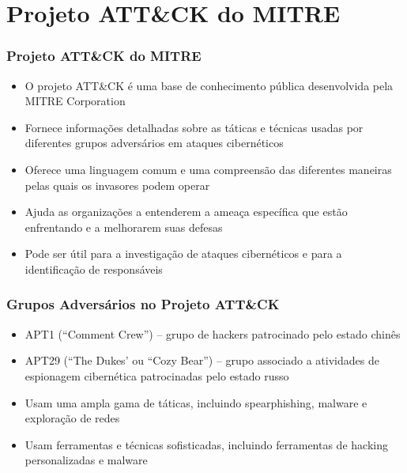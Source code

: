 \section{Projeto ATT\&CK do MITRE}
\begin{frame}
  \frametitle{Projeto ATT\&CK do MITRE}
  \begin{itemize}
    \item O projeto ATT\&CK é uma base de conhecimento pública desenvolvida pela MITRE Corporation
    \item Fornece informações detalhadas sobre as táticas e técnicas usadas por diferentes grupos adversários em ataques cibernéticos
    \item Oferece uma linguagem comum e uma compreensão das diferentes maneiras pelas quais os invasores podem operar
    \item Ajuda as organizações a entenderem a ameaça específica que estão enfrentando e a melhorarem suas defesas
    \item Pode ser útil para a investigação de ataques cibernéticos e para a identificação de responsáveis
  \end{itemize}
\end{frame}

\begin{frame}
  \frametitle{Grupos Adversários no Projeto ATT\&CK}
  \begin{itemize}
    \item APT1 (``Comment Crew'') -- grupo de hackers patrocinado pelo estado chinês
    \item APT29 (``The Dukes' ou ``Cozy Bear'') -- grupo associado a atividades de espionagem cibernética patrocinadas pelo estado russo
  \end{itemize}
  \begin{itemize}
    \item Usam uma ampla gama de táticas, incluindo spearphishing, malware e exploração de redes
    \item Usam ferramentas e técnicas sofisticadas, incluindo ferramentas de hacking personalizadas e malware
  \end{itemize}
\end{frame}
